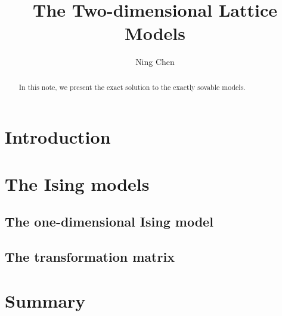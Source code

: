 \documentclass[11pt,aps,prd,showpacs,nofootinbib,superscriptaddress,preprint,preprintnumbers]{revtex4-1}
\begin{document}
\title{The Two-dimensional Lattice Models}


\author{Ning Chen}



\begin{abstract}
In this note, we present the exact solution to the exactly sovable models.
\end{abstract}


\maketitle
\baselineskip=16pt


\vspace{1.0cm}
\tableofcontents


\newpage



\section{Introduction}
\label{section:intro}







\section{ The Ising models }
\label{section:Ising}


\subsection{The one-dimensional Ising model}


\subsection{The transformation matrix}







\section{Summary}
\label{section:summary}
\end{document}
